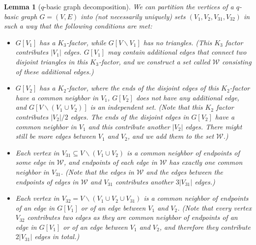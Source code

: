 \documentclass[bj,authoryear,noshowframe]{imsart}
\numberwithin{equation}{section}
\theoremstyle{plain}
\newtheorem{lem}[thm]{Lemma}
\theoremstyle{definition}
\renewcommand{\setminus}{\backslash}
\begin{document}
\begin{lem}[$q$-basic graph decomposition]
\label{lem:fridec20454pm}
We can partition the vertices of a $q$-basic graph $G=(V,E)$ into (not necessarily uniquely) sets $(V_1,V_2,V_{31}, V_{32})$ in such a way that the following conditions are met: 
\begin{itemize}
\item[(1)]  
$G[V_1]$ has a $K_3$-factor, while $G[V\setminus V_1]$ has no triangles. (This $K_3$ factor contributes $|V_1|$ edges. $G[V_1]$ may contain additional edges that connect two disjoint triangles in this $K_3$-factor, and we construct a set called $\mathcal{W}$ consisting of these additional edges.)
\item[(2)] $G[V_2]$ has a $K_2$-factor, where the ends of the disjoint edges of this $K_2$-factor have a common neighbor in $V_1$, $G[V_2]$ does not have any additional edge, and $G[V\setminus (V_1\cup V_2)]$ is an independent set. (Note that this $K_2$ factor contributes $|V_2|/2$ edges. The ends of the disjoint edges in $G[V_2]$ have a common neighbor in $V_1$ and this contribute another $|V_2|$ edges. There might still be more edges between $V_1$ and $V_2$, and we add them to the set $\mathcal{W}$.)
\item[(31)] 
Each vertex in $V_{31} \subseteq V\setminus (V_1\cup V_2)$ is a common neighbor of endpoints of some edge in $\mathcal{W}$, and endpoints of each edge in $\mathcal{W}$ has exactly one common neighbor in $V_{31}$. (Note that the edges in $\mathcal{W}$ and the edges between the endpoints of edges in $\mathcal{W}$ and $V_{31}$ contributes another $3|V_{31}|$ edges.)
\item[(32)] 
Each vertex in $V_{32}=V\setminus (V_1\cup V_2\cup V_{31})$ is a common neighbor of endpoints of an edge in $G[V_1]$ or of an edge between $V_1$ and $V_2$. (Note that every vertex $V_{32}$ contributes two edges as they are common neighbor of endpoints of an edge in $G[V_1]$ or of an edge between $V_1$ and $V_2$, and therefore they contribute  $2|V_{31}|$ edges in total.)
\end{itemize}
\end{lem}
\end{document}
